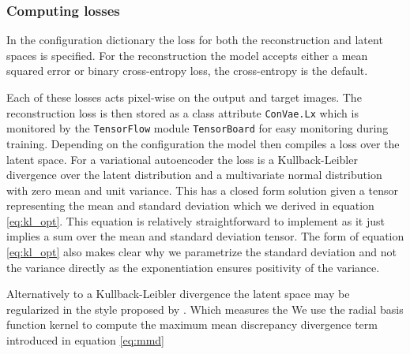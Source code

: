 \subsubsection{Computing losses}

In the configuration dictionary the loss for both the reconstruction and latent spaces is specified. For the reconstruction the model accepts either a mean squared error or binary cross-entropy loss, the cross-entropy is the default. 

Each of these losses acts pixel-wise on the output and target images. The reconstruction loss is then stored as a class attribute \lstinline{ConVae.Lx} which is monitored by the \lstinline{TensorFlow} module \lstinline{TensorBoard} for easy monitoring during training. Depending on the configuration the model then compiles a loss over the latent space. For a variational autoencoder the loss is a Kullback-Leibler divergence over the latent distribution and a multivariate normal distribution with zero mean and unit variance. This has a closed form solution given a tensor representing the mean and standard deviation which we derived in equation \ref{eq:kl_opt}. This equation is relatively straightforward to implement as it just implies a sum over the mean and standard deviation tensor. The form of equation \ref{eq:kl_opt} also makes clear why we parametrize the standard deviation and not the variance directly as the exponentiation ensures positivity of the variance. 

Alternatively to a Kullback-Leibler divergence the latent space may be regularized in the style proposed by \citet{Zhao}. Which measures the  We use the radial basis function kernel to compute the maximum mean discrepancy divergence term introduced in equation \ref{eq:mmd} 


